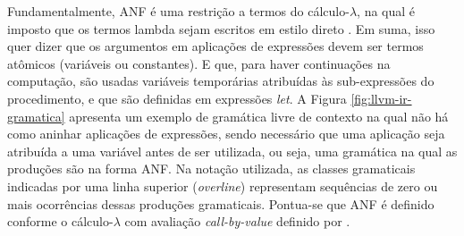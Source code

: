 


Fundamentalmente, ANF é uma restrição a termos do cálculo-$\lambda$, na qual é imposto que os termos lambda sejam escritos em estilo direto \cite{ssaToAnf}. Em suma, isso quer dizer que os argumentos em aplicações de expressões devem ser termos atômicos (variáveis ou constantes). E que, para haver continuações na computação, são usadas variáveis temporárias atribuídas às sub-expressões do procedimento, e que são definidas em expressões \emph{let}. A Figura \ref{fig:llvm-ir-gramatica} apresenta um exemplo de gramática livre de contexto na qual não há como aninhar aplicações de expressões, sendo necessário que uma aplicação seja atribuída a uma variável antes de ser utilizada, ou seja, uma gramática na qual as produções são na forma ANF. Na notação utilizada, as classes gramaticais indicadas por uma linha superior (\emph{overline}) representam sequências de zero ou mais ocorrências dessas produções gramaticais. Pontua-se que ANF é definido conforme o cálculo-$\lambda$ com avaliação \emph{call-by-value} definido por .

